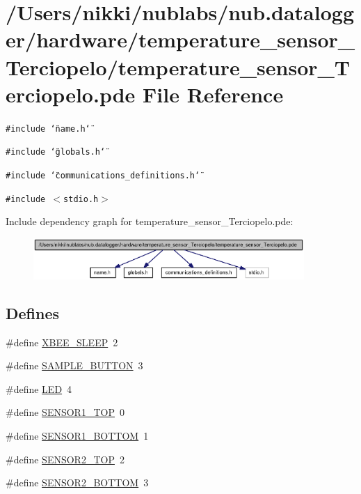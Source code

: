 \hypertarget{temperature__sensor___terciopelo_8pde}{
\section{/Users/nikki/nublabs/nub.datalogger/hardware/temperature\_\-sensor\_\-Terciopelo/temperature\_\-sensor\_\-Terciopelo.pde File Reference}
\label{temperature__sensor___terciopelo_8pde}
}
{\tt \#include \char`\"{}name.h\char`\"{}}\par
{\tt \#include \char`\"{}globals.h\char`\"{}}\par
{\tt \#include \char`\"{}communications\_\-definitions.h\char`\"{}}\par
{\tt \#include $<$stdio.h$>$}\par


Include dependency graph for temperature\_\-sensor\_\-Terciopelo.pde:\nopagebreak
\begin{figure}[H]
\begin{center}
\leavevmode
\includegraphics[width=292pt]{temperature__sensor___terciopelo_8pde__incl}
\end{center}
\end{figure}
\subsection*{Defines}
\begin{CompactItemize}
\item 
\#define \hyperlink{temperature__sensor___terciopelo_8pde_658c2878485cfe5cc625d283a6d34bc1}{XBEE\_\-SLEEP}~2
\item 
\#define \hyperlink{temperature__sensor___terciopelo_8pde_b2de299215608c2a35f0feb86adc2f6f}{SAMPLE\_\-BUTTON}~3
\item 
\#define \hyperlink{temperature__sensor___terciopelo_8pde_eb7a7ba1ab7e0406f1b5ab36d579f585}{LED}~4
\item 
\#define \hyperlink{temperature__sensor___terciopelo_8pde_2a2946288d28852ba343b09fd4f17d7a}{SENSOR1\_\-TOP}~0
\item 
\#define \hyperlink{temperature__sensor___terciopelo_8pde_0da2a51dcb3e00b10aedd07d75f22382}{SENSOR1\_\-BOTTOM}~1
\item 
\#define \hyperlink{temperature__sensor___terciopelo_8pde_645141ae2ab7fa7ac3f690c4959b6baf}{SENSOR2\_\-TOP}~2
\item 
\#define \hyperlink{temperature__sensor___terciopelo_8pde_df66e6da6cf8c78004dc0a75fd14d3b1}{SENSOR2\_\-BOTTOM}~3
\end{CompactItemize}
